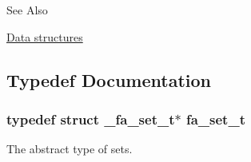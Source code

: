 \begin{DoxySeeAlso}{See Also}

\begin{DoxyItemize}
\item \hyperlink{md__data_structures_DataStructures}{Data structures} 
\end{DoxyItemize}
\end{DoxySeeAlso}


\subsection{Typedef Documentation}
\hypertarget{group___fa_set_ga7a64878223baf48e12857d8d5fda700c}{
\subsubsection[{fa\-\_\-set\-\_\-t}]{\setlength{\rightskip}{0pt plus 5cm}typedef struct \-\_\-fa\-\_\-set\-\_\-t$\ast$ {\bf fa\-\_\-set\-\_\-t}}}\label{group___fa_set_ga7a64878223baf48e12857d8d5fda700c}


The abstract type of sets. 



